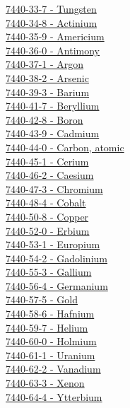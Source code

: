 \documentclass{book}
\begin{document}
\begin{multicols}{2}
\hyperref[sec:elem-tungsten]{7440-33-7 - Tungsten}\\
\hyperref[sec:elem-actinium]{7440-34-8 - Actinium}\\
\hyperref[sec:elem-americium]{7440-35-9 - Americium}\\
\hyperref[sec:elem-antimony]{7440-36-0 - Antimony}\\
\hyperref[sec:elem-argon]{7440-37-1 - Argon}\\
\hyperref[sec:elem-arsenic]{7440-38-2 - Arsenic}\\
\hyperref[sec:elem-barium]{7440-39-3 - Barium}\\
\hyperref[sec:elem-beryllium]{7440-41-7 - Beryllium}\\
\hyperref[sec:elem-boron]{7440-42-8 - Boron}\\
\hyperref[sec:elem-cadmium]{7440-43-9 - Cadmium}\\
\hyperref[sec:elem-carbon]{7440-44-0 - Carbon, atomic}\\
\hyperref[sec:elem-cerium]{7440-45-1 - Cerium}\\
\hyperref[sec:elem-caesium]{7440-46-2 - Caesium}\\
\hyperref[sec:elem-chromium]{7440-47-3 - Chromium}\\
\hyperref[sec:elem-cobalt]{7440-48-4 - Cobalt}\\
\hyperref[sec:elem-copper]{7440-50-8 - Copper}\\
\hyperref[sec:elem-erbium]{7440-52-0 - Erbium}\\
\hyperref[sec:elem-europium]{7440-53-1 - Europium}\\
\hyperref[sec:elem-gadolinium]{7440-54-2 - Gadolinium}\\
\hyperref[sec:elem-gallium]{7440-55-3 - Gallium}\\
\hyperref[sec:elem-germanium]{7440-56-4 - Germanium}\\
\hyperref[sec:elem-gold]{7440-57-5 - Gold}\\
\hyperref[sec:elem-hafnium]{7440-58-6 - Hafnium}\\
\hyperref[sec:elem-helium]{7440-59-7 - Helium}\\
\hyperref[sec:elem-holmium]{7440-60-0 - Holmium}\\
\hyperref[sec:elem-uranium]{7440-61-1 - Uranium}\\
\hyperref[sec:elem-vanadium]{7440-62-2 - Vanadium}\\
\hyperref[sec:elem-xenon]{7440-63-3 - Xenon}\\
\hyperref[sec:elem-ytterbium]{7440-64-4 - Ytterbium}\\

\end{multicols}
\end{document}
